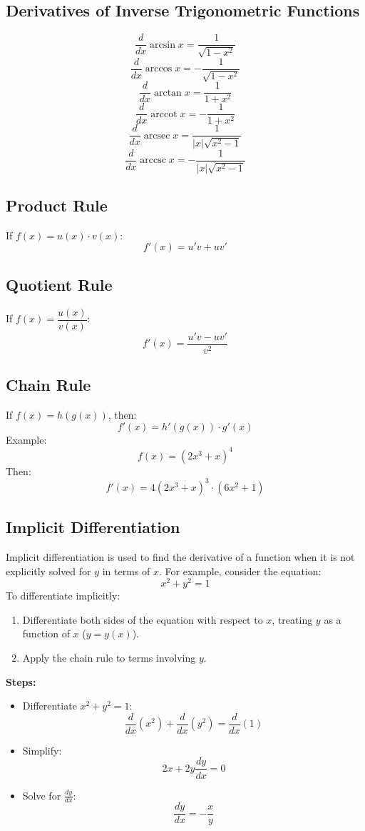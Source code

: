 \documentclass{article}
\begin{document}
\begin{multicols}{2}
\subsection*{Derivatives of Inverse Trigonometric Functions}
\[
\frac{d}{dx} \arcsin x = \frac{1}{\sqrt{1 - x^2}}
\]
\[
\frac{d}{dx} \arccos x = -\frac{1}{\sqrt{1 - x^2}}
\]
\[
\frac{d}{dx} \arctan x = \frac{1}{1 + x^2}
\]
\[
\frac{d}{dx} \operatorname{arccot} x = -\frac{1}{1 + x^2}
\]
\[
\frac{d}{dx} \operatorname{arcsec} x = \frac{1}{|x|\sqrt{x^2 - 1}}
\]
\[
\frac{d}{dx} \operatorname{arccsc} x = -\frac{1}{|x|\sqrt{x^2 - 1}}
\]

\subsection*{Product Rule}
If \( f(x) = u(x) \cdot v(x) \):
\[
f'(x) = u'v + uv'
\]

\subsection*{Quotient Rule}
If \( f(x) = \dfrac{u(x)}{v(x)} \):
\[
f'(x) = \frac{u'v - uv'}{v^2}
\]

\subsection*{Chain Rule}
If \( f(x) = h(g(x)) \), then:
\[
f'(x) = h'(g(x)) \cdot g'(x)
\]
Example:
\[
f(x) = (2x^3 + x)^4
\]
Then:
\[
f'(x) = 4(2x^3 + x)^3 \cdot (6x^2 + 1)
\]

\subsection*{Implicit Differentiation}

Implicit differentiation is used to find the derivative of a function when it is not explicitly solved for \(y\) in terms of \(x\). For example, consider the equation:
\[
x^2 + y^2 = 1
\]
To differentiate implicitly:
\begin{enumerate}
    \item Differentiate both sides of the equation with respect to \(x\), treating \(y\) as a function of \(x\) (\(y = y(x)\)).
    \item Apply the chain rule to terms involving \(y\).
\end{enumerate}
\textbf{Steps:}
\begin{itemize}
    \item Differentiate \(x^2 + y^2 = 1\):
    \[
    \frac{d}{dx}(x^2) + \frac{d}{dx}(y^2) = \frac{d}{dx}(1)
    \]
    \item Simplify:
    \[
    2x + 2y \frac{dy}{dx} = 0
    \]
    \item Solve for \(\frac{dy}{dx}\):
    \[
    \frac{dy}{dx} = -\frac{x}{y}
    \]
\end{itemize}


\end{multicols}
\end{document}
